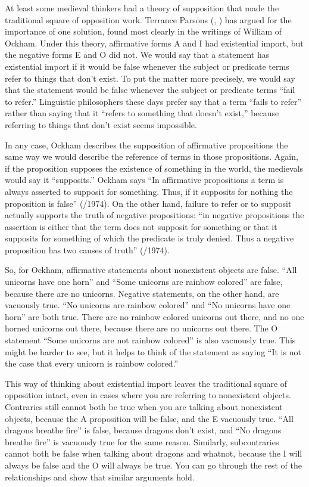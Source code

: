 At least some medieval thinkers had a theory of supposition that made the traditional square of opposition work. Terrance Parsons (\citeyear{Parsons1997}, \citeyear{Parsons2008})  has argued for the importance of one solution, found most clearly in the writings of William of Ockham. Under this theory, affirmative forms A and I had existential import, but the negative forms E and O did not. We would say that a statement has existential import if it would be false whenever the subject or predicate terms refer to things that don't exist. To put the matter more precisely, we would say that the statement would be false whenever the subject or predicate terms ``fail to refer.'' Linguistic philosophers these days prefer say that a term ``fails to refer'' rather than saying that it ``refers to something that doesn't exist,'' because referring to things that don't exist seems impossible.

In any case, Ockham describes the supposition of affirmative propositions the same way we would describe the reference of terms in those propositions. Again, if the proposition supposes the existence of something in the world, the medievals would say it ``supposits.''  Ockham says ``In affirmative propositions a term is always asserted to supposit for something. Thus, if it supposits for nothing the proposition is false'' (\citeyear{Ockham1343}/1974). On the other hand, failure to refer or to supposit actually supports the truth of negative propositions: ``in negative propositions the assertion is either that the term does not supposit for something or that it supposits for something of which the predicate is truly denied. Thus a negative proposition has two causes of truth'' (\citeyear{Ockham1343}/1974).

So, for Ockham, affirmative statements about nonexistent objects are false. ``All unicorns have one horn'' and ``Some unicorns are rainbow colored'' are false, because there are no unicorns. Negative statements, on the other hand, are vacuously true. ``No unicorns are rainbow colored'' and ``No unicorns have one horn'' are both true. There are no rainbow colored unicorns out there, and no one horned unicorns out there, because there are no unicorns out there. The O statement ``Some unicorns are not rainbow colored'' is also vacuously true. This might be harder to see, but it helps to think of the statement as saying ``It is not the case that every unicorn is rainbow colored.'' 

This way of thinking about existential import leaves the traditional square of opposition intact, even in cases where you are referring to nonexistent objects. Contraries still cannot both be true when you are talking about nonexistent objects, because the A proposition will be false, and the E vacuously true. ``All dragons breathe fire'' is false, because dragons don't exist, and ``No dragons breathe fire'' is vacuously true for the same reason. Similarly, subcontraries cannot both be false when talking about dragons and whatnot, because the I will always be false and the O will always be true. You can go through the rest of the relationships and show that similar arguments hold. \label{proving_trad_square}
         
